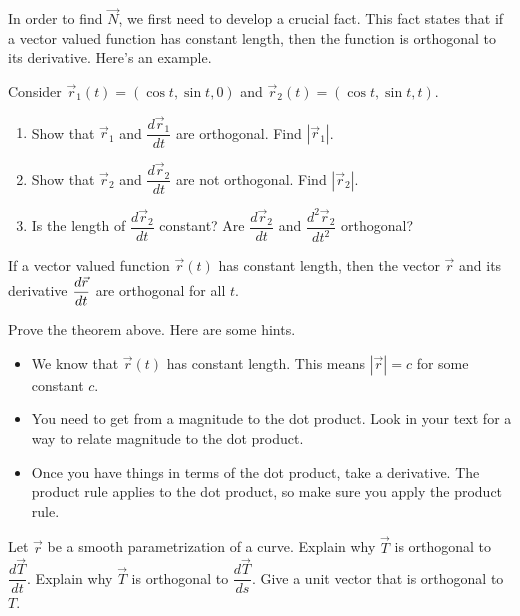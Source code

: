 In order to find $\vec N$, we first need to develop a crucial fact.  This fact states that if a vector valued function has constant length, then the function is orthogonal to its derivative. Here's an example. 

\begin{problem}
 Consider  $\vec r_1(t)=(\cos t, \sin t, 0)$ and $\vec r_2(t)=(\cos t, \sin t, t)$. 
\begin{enumerate}
 \item Show that $\vec r_1$ and $\dfrac{d\vec r_1}{dt}$ are orthogonal. Find $|\vec r_1|$.
 \item Show that $\vec r_2$ and $\dfrac{d\vec r_2}{dt}$ are not orthogonal. Find $|\vec r_2|$.
 \item Is the length of $\dfrac{d\vec r_2}{dt}$ constant? Are $\dfrac{d\vec r_2}{dt}$ and $\dfrac{d^2\vec r_2}{dt^2}$ orthogonal? 
\end{enumerate}
\end{problem}

\begin{theorem}\label{vector valued functions of constant length}
 If a vector valued function $\vec r(t)$ has constant length, then the vector $\vec r$ and its derivative $\displaystyle\frac{d\vec r}{dt}$ are orthogonal for all $t$. 
\end{theorem}

\begin{problem}%
 Prove the theorem above. Here are some hints.
\begin{itemize}
 \item We know that $\vec r(t)$ has constant length. This means $|\vec r|=c$ for some constant $c$. 
 \item You need to get from a magnitude to the dot product. Look in your text for a way to relate magnitude to the dot product.
 \item Once you have things in terms of the dot product, take a derivative. The product rule applies to the dot product, so make sure you apply the product rule.
\end{itemize}
\end{problem}


\begin{problem}\label{T and N are orthogonal}%
 Let $\vec r$ be a smooth parametrization of a curve.  Explain why $\vec T$ is orthogonal to $\dfrac{d\vec T}{dt}$. Explain why $\vec T$ is orthogonal to $\dfrac{d\vec T}{ds}$. Give a unit vector that is orthogonal to $T$.
\end{problem}

